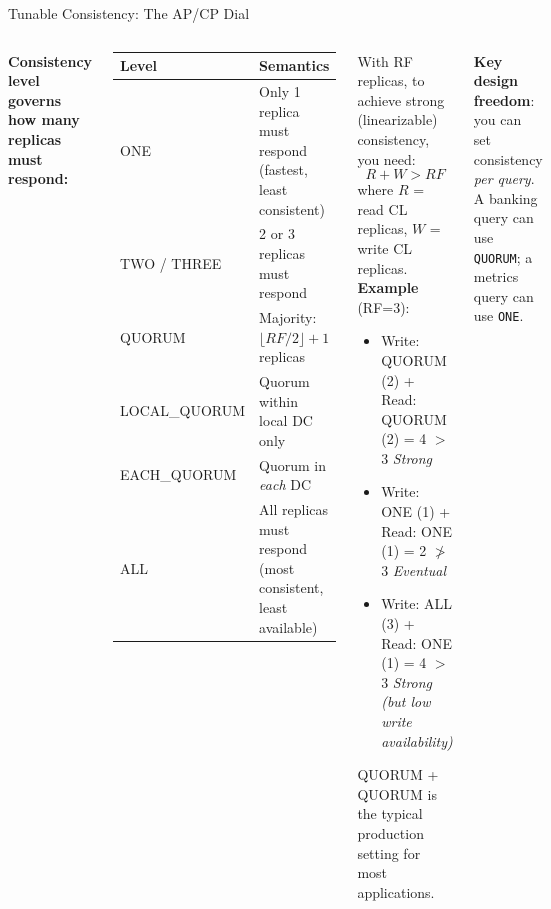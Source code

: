 \documentclass[aspectratio=169]{beamer}
\begin{document}
\begin{frame}{Tunable Consistency: The AP/CP Dial}
  \begin{columns}[T]
      \small
      \textbf{Consistency level governs how many replicas must respond:}
      \vspace{0.2cm}
      \begin{center}
        \renewcommand{\arraystretch}{1.3}
        \begin{tabular}{>{\ttfamily\scriptsize}p{2.0cm} p{3.6cm}}
          \toprule
          \textbf{Level} & \textbf{Semantics} \\
          \midrule
          ONE & Only 1 replica must respond (fastest, least consistent) \\
          TWO / THREE & 2 or 3 replicas must respond \\
          QUORUM & Majority: $\lfloor RF/2 \rfloor + 1$ replicas \\
          LOCAL\_QUORUM & Quorum within local DC only \\
          EACH\_QUORUM & Quorum in \textit{each} DC \\
          ALL & All replicas must respond (most consistent, least available) \\
          \bottomrule
        \end{tabular}
      \end{center}
      \begin{tcolorbox}[deepdivebox, title={Deep Dive: Strong Consistency Formula}]
        \scriptsize
        With RF replicas, to achieve strong (linearizable) consistency, you need:
        \[R + W > RF\]
        where $R$ = read CL replicas, $W$ = write CL replicas.
        \vspace{0.1cm}\\
        \textbf{Example} (RF=3):
        \begin{itemize}
          \item Write: QUORUM (2) + Read: QUORUM (2) = 4 $>$ 3 \checkmark \textit{Strong}
          \item Write: ONE (1) + Read: ONE (1) = 2 $\not>$ 3 \texttimes \textit{Eventual}
          \item Write: ALL (3) + Read: ONE (1) = 4 $>$ 3 \checkmark \textit{Strong (but low write availability)}
        \end{itemize}
        QUORUM + QUORUM is the typical production setting for most applications.
      \end{tcolorbox}
      \vspace{0.2cm}
      \begin{tcolorbox}[cassbox]
        \scriptsize
        \textbf{Key design freedom}: you can set consistency \textit{per query}. A banking query can use \texttt{QUORUM}; a metrics query can use \texttt{ONE}.
      \end{tcolorbox}
  \end{columns}
\end{frame}
\end{document}
